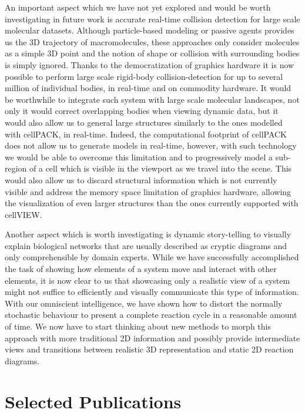 An important aspect which we have not yet explored and would be worth investigating in future work is accurate real-time collision detection for large scale molecular datasets.
Although particle-based modeling or passive agents provides us the 3D trajectory of macromolecules, these approaches only consider molecules as a simple 3D point and the notion of shape or collision with surrounding bodies is simply ignored.
Thanks to the democratization of graphics hardware it is now possible to perform large scale rigid-body collision-detection for up to several million of individual bodies, in real-time and on commodity hardware.
It would be worthwhile to integrate such system with large scale molecular landscapes, not only it would correct overlapping bodies when viewing dynamic data, but it would also allow us to general large structures similarly to the ones modelled with cellPACK, in real-time.
Indeed, the computational footprint of cellPACK does not allow us to generate models in real-time, however, with such technology we would be able to overcome this limitation and to progressively model a sub-region of a cell which is visible in the viewport as we travel into the scene.
This would also allow us to discard structural information which is not currently visible and address the memory space limitation of graphics hardware, allowing the visualization of even larger structures than the ones currently supported with cellVIEW.

Another aspect which is worth investigating is dynamic story-telling to visually explain biological networks that are usually described as cryptic diagrams and only comprehensible by domain experts.
While we have successfully accomplished the task of showing how elements of a system move and interact with other elements, it is now clear to us that showcasing only a realistic view of a system might not suffice to efficiently and visually communicate this type of information.
With our omniscient intelligence, we have shown how to distort the normally stochastic behaviour to present a complete reaction cycle in a reasonable amount of time.
We now have to start thinking about new methods to morph this approach with more traditional 2D information and possibly provide intermediate views and transitions between realistic 3D representation and static 2D reaction diagrams.


\part{Selected Publications}

